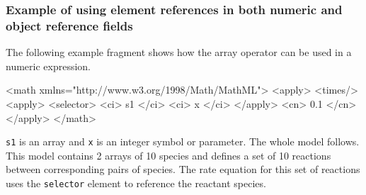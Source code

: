 \documentclass{cekarticle}
\begin{document}
\subsubsection{Example of using element references in both numeric and object reference fields}

The following example fragment shows how the array operator can be used in
a numeric expression.  
\begin{example}
<math xmlns="http://www.w3.org/1998/Math/MathML">
    <apply>
        <times/>
        <apply>
            <selector>
            <ci> s1 </ci>
            <ci> x </ci>
        </apply>
        <cn> 0.1 </cn>
    </apply>
</math>
\end{example}

\texttt{s1} is an array and \texttt{x} is an integer symbol or parameter.
The whole model follows.  This model contains 2 arrays of 10 species and defines
a set of 10 reactions between corresponding pairs of species. The rate equation
for this set of reactions uses the \texttt{selector} element to reference the reactant species.
\end{document}
